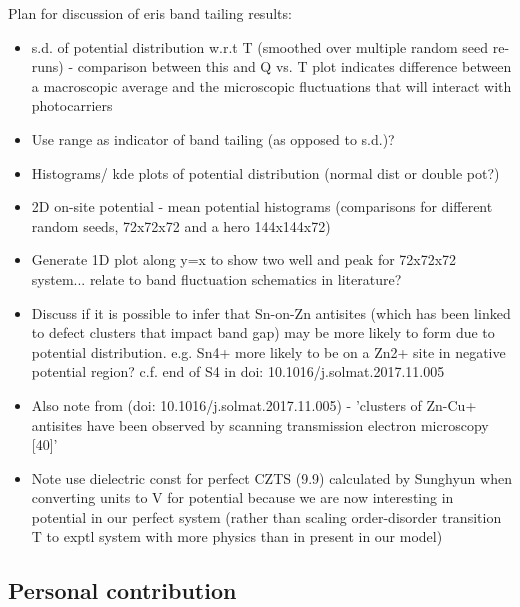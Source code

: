 \documentclass[11pt, twoside]{report}
\begin{document}
Plan for discussion of eris band tailing results:
\begin{itemize}
\item s.d. of potential distribution w.r.t T (smoothed over multiple random seed re-runs) - comparison between this and Q vs. T plot indicates difference between a macroscopic average and the microscopic fluctuations that will interact with photocarriers
\item Use range as indicator of band tailing (as opposed to s.d.)?
\item Histograms/ kde plots of potential distribution (normal dist or double pot?)
\item 2D on-site potential - mean potential histograms (comparisons for different random seeds, 72x72x72 and a hero 144x144x72)
\item Generate 1D plot along y=x to show two well and peak for 72x72x72 system... relate to band fluctuation schematics in literature?
\item Discuss if it is possible to infer that Sn-on-Zn antisites (which has been linked to defect clusters that impact band gap) may be more likely to form due to potential distribution. e.g. Sn4+ more likely to be on a Zn2+ site in negative potential region? c.f. end of S4 in doi: 10.1016/j.solmat.2017.11.005
\item Also note from (doi: 10.1016/j.solmat.2017.11.005) - 'clusters of Zn-Cu+ antisites have been observed by scanning transmission electron microscopy [40]'
\item Note use dielectric const for perfect CZTS (9.9) calculated by Sunghyun when converting units to V for potential because we are now interesting in potential in our perfect system (rather than scaling order-disorder transition T to exptl system with more physics than in present in our model)
\end{itemize}



\subsection{Personal contribution}
\end{document}
